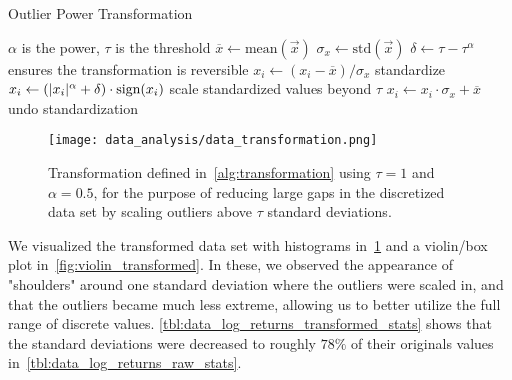 \begin{algorithm}
\caption{Outlier Power Transformation}
\begin{algorithmic}[1]
            \Comment $\alpha$ is the power, $\tau$ is the threshold
        \State $\overline{x} \gets \text{mean}(\vec{x})$
        \State $\sigma_{x} \gets \text{std}(\vec{x})$
        \State $\delta \gets \tau - \tau^\alpha$
            \Comment ensures the transformation is reversible
            \State $x_i \gets (x_i - \overline{x}) / \sigma_x$
                \Comment standardize
                \State $x_i \gets (\lvert x_i\rvert^\alpha + \delta) \cdot \text{sign}(x_i)$
                    \Comment scale standardized values beyond $\tau$
            \EndIf
            \State $x_i \gets x_i \cdot \sigma_x + \overline{x}$
                \Comment undo standardization
        \EndFor
    \EndProcedure
\end{algorithmic}
\label{alg:transformation}
\end{algorithm}

\begin{figure}[!htb]
    \begin{center}
        \texttt{[image: data\_analysis/data\_transformation.png]}
    \end{center}
    \caption{Transformation defined in~\cref{alg:transformation} using \( \tau = 1 \) and \( \alpha = 0.5 \), for the purpose of reducing large gaps in the discretized data set by scaling outliers above \( \tau \) standard deviations.}
    \label{fig:data_transformation}
\end{figure}

We visualized the transformed data set with histograms in~\cref{fig:data_transformation} and a violin/box plot in~\cref{fig:violin_transformed}.
In these, we observed the appearance of "shoulders" around one standard deviation where the outliers were scaled in, and that the outliers became much less extreme, allowing us to better utilize the full range of discrete values.
\cref{tbl:data_log_returns_transformed_stats} shows that the standard deviations were decreased to roughly \( 78\% \) of their originals values in~\cref{tbl:data_log_returns_raw_stats}.

